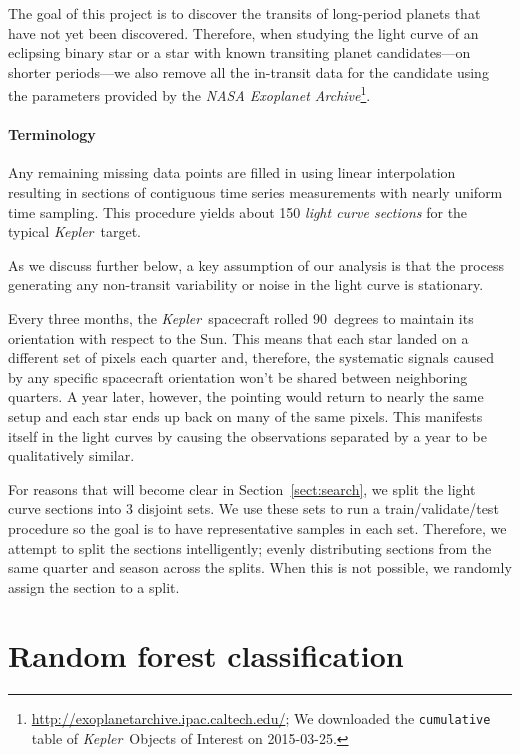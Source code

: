 \documentclass[12pt,preprint]{aastex}
\newcommand{\project}[1]{\textsl{#1}}
\newcommand{\kepler}{\project{Kepler}}
\newcommand{\sectionname}{Section}
\newcommand{\Sect}[1]{\sectionname~\ref{sect:#1}}
\newcommand{\sect}[1]{\Sect{#1}}
\begin{document}
The goal of this project is to discover the transits of long-period planets
that have not yet been discovered.
Therefore, when studying the light curve of an eclipsing binary star or a star
with known transiting planet candidates---on shorter periods---we also remove
all the in-transit data for the candidate using the parameters provided by the
\project{NASA Exoplanet
Archive}\footnote{\url{http://exoplanetarchive.ipac.caltech.edu/}; We
downloaded the \texttt{cumulative} table of \kepler\ Objects of Interest on
2015-03-25.}.

\paragraph{Terminology}

Any remaining missing data points are filled in using linear interpolation
resulting in sections of contiguous time series measurements with nearly
uniform time sampling.
This procedure yields about 150 \emph{light curve sections} for the typical
\kepler\ target.

As we discuss further below, a key assumption of our analysis is that the
process generating any non-transit variability or noise in the light curve
is stationary.

Every three months, the \kepler\ spacecraft rolled 90~degrees to maintain its
orientation with respect to the Sun.
This means that each star landed on a different set of pixels each quarter
and, therefore, the systematic signals caused by any specific spacecraft
orientation won't be shared between neighboring quarters.
A year later, however, the pointing would return to nearly the same setup and
each star ends up back on many of the same pixels.
This manifests itself in the light curves by causing the observations
separated by a year to be qualitatively similar.

For reasons that will become clear in \sect{search}, we split the light curve
sections into 3 disjoint sets.
We use these sets to run a train/validate/test procedure so the goal is to
have representative samples in each set.
Therefore, we attempt to split the sections intelligently; evenly
distributing sections from the same quarter and season across the splits.
When this is not possible, we randomly assign the section to a split.


\section{Random forest classification}
\end{document}

